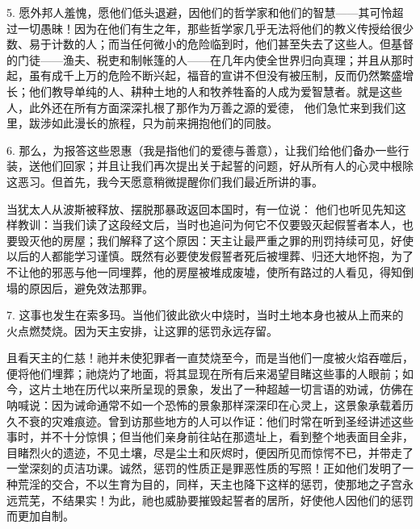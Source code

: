 5. 愿外邦人羞愧，愿他们低头退避，因他们的哲学家和他们的智慧——其可怜超过一切愚昧！因为在他们有生之年，那些哲学家几乎无法将他们的教义传授给很少数、易于计数的人；而当任何微小的危险临到时，他们甚至失去了这些人。但基督的门徒——渔夫、税吏和制帐篷的人——在几年内使全世界归向真理；并且从那时起，虽有成千上万的危险不断兴起，福音的宣讲不但没有被压制，反而仍然繁盛增长；他们教导单纯的人、耕种土地的人和牧养牲畜的人成为爱智慧者。就是这些人，此外还在所有方面深深扎根了那作为万善之源的爱德， 他们急忙来到我们这里，跋涉如此漫长的旅程，只为前来拥抱他们的同肢。\par

6. 那么，为报答这些恩惠（我是指他们的爱德与善意），让我们给他们备办一些行装，送他们回家；并且让我们再次提出关于起誓的问题，好从所有人的心灵中根除这恶习。但首先，我今天愿意稍微提醒你们我们最近所讲的事。\par

当犹太人从波斯被释放、摆脱那暴政返回本国时，有一位说： 他们也听见先知这样教训：当我们读了这段经文后，当时也追问为何它不仅要毁灭起假誓者本人，也要毁灭他的房屋；我们解释了这个原因：天主让最严重之罪的刑罚持续可见，好使以后的人都能学习谨慎。既然有必要使发假誓者死后被埋葬、归还大地怀抱，为了不让他的邪恶与他一同埋葬，他的房屋被堆成废墟，使所有路过的人看见，得知倒塌的原因后，避免效法那罪。\par

7. 这事也发生在索多玛。当他们彼此欲火中烧时，当时土地本身也被从上而来的火点燃焚烧。因为天主安排，让这罪的惩罚永远存留。\par

且看天主的仁慈！祂并未使犯罪者一直焚烧至今，而是当他们一度被火焰吞噬后，便将他们埋葬；祂烧灼了地面，将其显现在所有后来渴望目睹这些事的人眼前；如今，这片土地在历代以来所呈现的景象，发出了一种超越一切言语的劝诫，仿佛在呐喊说：因为诫命通常不如一个恐怖的景象那样深深印在心灵上，这景象承载着历久不衰的灾难痕迹。曾到访那些地方的人可以作证：他们时常在听到圣经讲述这些事时，并不十分惊惧；但当他们亲身前往站在那遗址上，看到整个地表面目全非，目睹烈火的遗迹，不见土壤，尽是尘土和灰烬时，便因所见而惊愕不已，并带走了一堂深刻的贞洁功课。诚然，惩罚的性质正是罪恶性质的写照！正如他们发明了一种荒淫的交合，不以生育为目的，同样，天主也降下这样的惩罚，使那地之子宫永远荒芜，不结果实！为此，祂也威胁要摧毁起誓者的居所，好使他人因他们的惩罚而更加自制。\par

